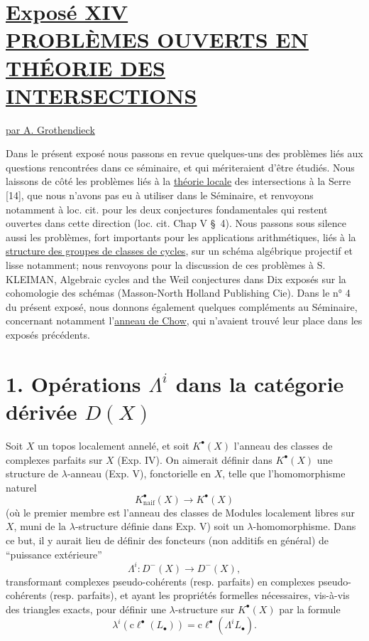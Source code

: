 
\section*{\underline{Exposé XIV}\\[3pt] \underline{\underline{PROBLÈMES OUVERTS EN THÉORIE DES INTERSECTIONS}}}
\begin{center}
\underline{par A. Grothendieck}
\end{center}

Dans le présent exposé nous passons en revue quelques-uns des problèmes liés aux questions rencontrées dans ce séminaire, et qui mériteraient d'être étudiés. Nous laissons de côté les problèmes liés à la \uline{théorie locale} des intersections à la Serre [14], que nous n'avons pas eu à utiliser dans le Séminaire, et renvoyons notamment à loc. cit. pour les deux conjectures fondamentales qui restent ouvertes dans cette direction (loc. cit. Chap V \S~4). Nous passons sous silence aussi les problèmes, fort importants pour les applications arithmétiques, liés à la \uline{structure des groupes de classes de cycles}, sur un schéma algébrique projectif et lisse notamment; nous renvoyons pour la discussion de ces problèmes à S. KLEIMAN, Algebraic cycles and the Weil conjectures dans Dix exposés sur la cohomologie des schémas (Masson-North Holland Publishing Cie). Dans le n° 4 du présent exposé, nous donnons également quelques compléments au Séminaire, concernant notamment l'\uline{anneau de Chow}, qui n'avaient trouvé leur place dans les exposés précédents.

\section*{1. Opérations $\Lambda^i$ dans la catégorie dérivée $D(X)$\SGAAuthorFootMark{*}}

Soit $X$ un topos localement annelé, et soit $K^\bullet(X)$ l'anneau des classes de complexes parfaits sur $X$ (Exp. IV). On aimerait définir dans $K^\bullet(X)$ une structure de $\lambda$-anneau (Exp. V), fonctorielle en $X$, telle que l'homomorphisme naturel
\[
 K^\bullet_{\mathrm{naif}}(X)\longrightarrow K^\bullet(X)
\]
(où le premier membre est l'anneau des classes de Modules localement libres sur $X$, muni de la $\lambda$-structure définie dans Exp. V) soit un $\lambda$-homomorphisme. Dans ce but, il y aurait lieu de définir des foncteurs (non additifs en général) de ``puissance extérieure''
\[
 \Lambda^i:D^-(X)\longrightarrow D^-(X),
\]
transformant complexes pseudo-cohérents (resp. parfaits) en complexes pseudo-cohérents (resp. parfaits), et ayant les propriétés formelles nécessaires, vis-à-vis des triangles exacts, pour définir une $\lambda$-structure sur $K^\bullet(X)$ par la formule
\begin{equation}\tag{1.1}
 \lambda^i(\mathrm{c}\ell^\bullet(L_\bullet))=\mathrm{c}\ell^\bullet(\Lambda^i L_\bullet).
\end{equation}

